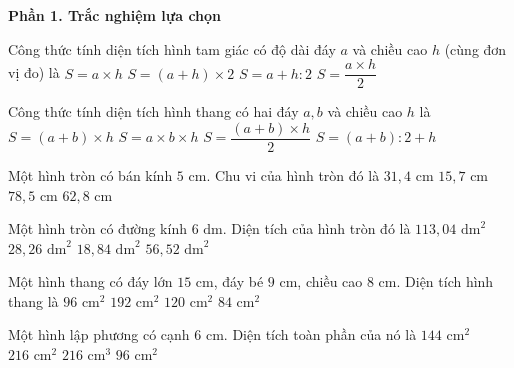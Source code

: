 \textbf{Phần 1. Trắc nghiệm lựa chọn}

\begin{ex} %
Công thức tính diện tích hình tam giác có độ dài đáy $a$ và chiều cao $h$ (cùng đơn vị đo) là
\choice
{$S = a \times h$}
{$S = (a + h) \times 2$}
{$S = a + h : 2$}
{\True $S = \dfrac{a \times h}{2}$}
\end{ex}

\begin{ex} %
Công thức tính diện tích hình thang có hai đáy $a, b$ và chiều cao $h$ là
\choice
{$S = (a + b) \times h$}
{$S = a \times b \times h$}
{\True $S = \dfrac{(a + b) \times h}{2}$}
{$S = (a + b) : 2 + h$}
\end{ex}

\begin{ex} %
Một hình tròn có bán kính $5\text{ cm}$. Chu vi của hình tròn đó là
\choice
{\True $31{,}4\text{ cm}$}
{$15{,}7\text{ cm}$}
{$78{,}5\text{ cm}$}
{$62{,}8\text{ cm}$}
\end{ex}

\begin{ex} %
Một hình tròn có đường kính $6\text{ dm}$. Diện tích của hình tròn đó là
\choice
{$113{,}04\text{ dm}^2$}
{\True $28{,}26\text{ dm}^2$}
{$18{,}84\text{ dm}^2$}
{$56{,}52\text{ dm}^2$}
\end{ex}

\begin{ex} %
Một hình thang có đáy lớn $15\text{ cm}$, đáy bé $9\text{ cm}$, chiều cao $8\text{ cm}$. Diện tích hình thang là
\choice
{\True $96\text{ cm}^2$}
{$192\text{ cm}^2$}
{$120\text{ cm}^2$}
{$84\text{ cm}^2$}
\end{ex}

\begin{ex} %
Một hình lập phương có cạnh $6\text{ cm}$. Diện tích toàn phần của nó là
\choice
{$144\text{ cm}^2$}
{\True $216\text{ cm}^2$}
{$216\text{ cm}^3$}
{$96\text{ cm}^2$}
\end{ex}

